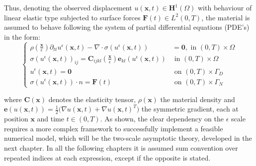 Thus, denoting the observed displacement $u(\mathbf{x},t) \in \mathbf{H}^1(\Omega)$ with behaviour of linear elastic type subjected to surface forces $\mathbf{F}(t) \in L^2 (0, T)$, the material is assumed to behave following the system of partial differential equations (PDE's) in the form:
\begin{equation*}
    \left \{
    \begin{aligned}
        \rho (\frac{\mathbf{x}}{\epsilon}) \partial_{tt} u^{\epsilon}(\mathbf{x},t) - \nabla \cdot \sigma (u^{\epsilon}(\mathbf{x},t)) & = \mathbf{0}, \text{ in } (0,T)\times \Omega \\
        \sigma(u^{\epsilon}(\mathbf{x},t))_{ij} = \mathbf{C}_{ijkl}(\frac{\mathbf{x}}{\epsilon}) \mathbf{e}_{kl}(u^{\epsilon}(\mathbf{x},t)) & \text{ in } (0,T)\times \Omega \\
        u^{\epsilon}(\mathbf{x},t) = \mathbf{0} & \text{ on } (0,T)\times \Gamma_D\\
        \sigma(u^{\epsilon}(\mathbf{x},t)) \cdot n = \mathbf{F}(t) & \text{ on } (0,T)\times \Gamma_N
    \end{aligned}
    \right .
\end{equation*}

where $\mathbf{C}(\mathbf{x})$ denotes the elasticity tensor, $\rho(\mathbf{x})$ the material density and $\mathbf{e}(u(\mathbf{x},t)) = \frac{1}{2}\big( \nabla u(\mathbf{x},t) + \nabla u(\mathbf{x},t)^{T}\big)$ the symmetric gradient, each at position $\mathbf{x}$ and time $t \in (0,T)$. As shown, the clear dependency on the $\epsilon$ scale requires a more complex framework to successfully implement a feasible numerical model, which will be the two-scale asymptotic theory, developed in the next chapter. In all the following chapters it is assumed sum convention over repeated indices at each expression, except if the opposite is stated.



